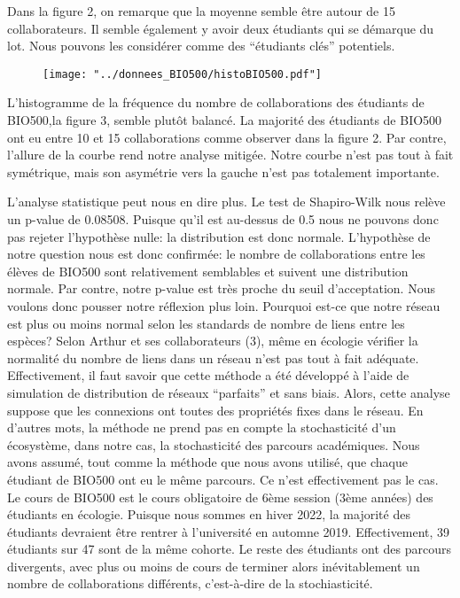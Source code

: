 \documentclass[9pt,twocolumn,twoside,]{pnas-new}
\begin{document}
Dans la figure 2, on remarque que la moyenne semble être autour de 15
collaborateurs. Il semble également y avoir deux étudiants qui se
démarque du lot. Nous pouvons les considérer comme des ``étudiants
clés'' potentiels.

\begin{figure}
\centering
\texttt{[image: "../donnees\_BIO500/histoBIO500.pdf"]}
\caption{\label{fig:plot3}}
\end{figure}

L'histogramme de la fréquence du nombre de collaborations des étudiants
de BIO500,la figure 3, semble plutôt balancé. La majorité des étudiants
de BIO500 ont eu entre 10 et 15 collaborations comme observer dans la
figure 2. Par contre, l'allure de la courbe rend notre analyse mitigée.
Notre courbe n'est pas tout à fait symétrique, mais son asymétrie vers
la gauche n'est pas totalement importante.

L'analyse statistique peut nous en dire plus. Le test de Shapiro-Wilk
nous relève un p-value de 0.08508. Puisque qu'il est au-dessus de 0.5
nous ne pouvons donc pas rejeter l'hypothèse nulle: la distribution est
donc normale. L'hypothèse de notre question nous est donc confirmée: le
nombre de collaborations entre les élèves de BIO500 sont relativement
semblables et suivent une distribution normale. Par contre, notre
p-value est très proche du seuil d'acceptation. Nous voulons donc
pousser notre réflexion plus loin. Pourquoi est-ce que notre réseau est
plus ou moins normal selon les standards de nombre de liens entre les
espèces? Selon Arthur et ses collaborateurs (3), même en écologie
vérifier la normalité du nombre de liens dans un réseau n'est pas tout à
fait adéquate. Effectivement, il faut savoir que cette méthode a été
développé à l'aide de simulation de distribution de réseaux ``parfaits''
et sans biais. Alors, cette analyse suppose que les connexions ont
toutes des propriétés fixes dans le réseau. En d'autres mots, la méthode
ne prend pas en compte la stochasticité d'un écosystème, dans notre cas,
la stochasticité des parcours académiques. Nous avons assumé, tout comme
la méthode que nous avons utilisé, que chaque étudiant de BIO500 ont eu
le même parcours. Ce n'est effectivement pas le cas. Le cours de BIO500
est le cours obligatoire de 6ème session (3ème années) des étudiants en
écologie. Puisque nous sommes en hiver 2022, la majorité des étudiants
devraient être rentrer à l'université en automne 2019. Effectivement, 39
étudiants sur 47 sont de la même cohorte. Le reste des étudiants ont des
parcours divergents, avec plus ou moins de cours de terminer alors
inévitablement un nombre de collaborations différents, c'est-à-dire de
la stochiasticité.
\end{document}
